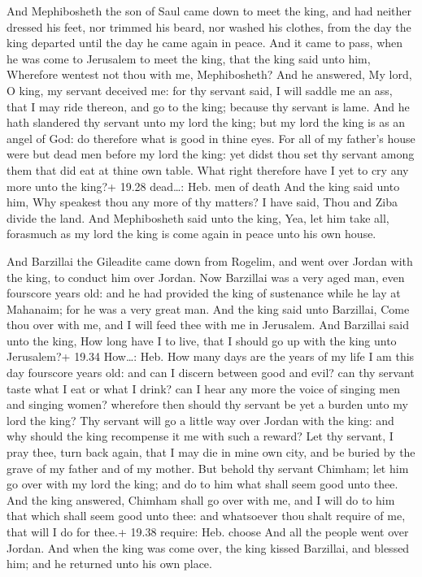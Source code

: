  And Mephibosheth the son of Saul came down to meet the
king, and had neither dressed his feet, nor trimmed his beard, nor
washed his clothes, from the day the king departed until the day he came
again in peace.  And it came to pass, when he was come to
Jerusalem to meet the king, that the king said unto him, Wherefore
wentest not thou with me, Mephibosheth?  And he answered,
My lord, O king, my servant deceived me: for thy servant said, I will
saddle me an ass, that I may ride thereon, and go to the king; because
thy servant is lame.  And he hath slandered thy servant
unto my lord the king; but my lord the king is as an angel of God: do
therefore what is good in thine eyes.  For all of my
father's house were but dead men before my lord the king: yet didst thou
set thy servant among them that did eat at thine own table. What right
therefore have I yet to cry any more unto the king?+ 19.28 dead\ldots:
Heb. men of death  And the king said unto him, Why speakest
thou any more of thy matters? I have said, Thou and Ziba divide the
land.  And Mephibosheth said unto the king, Yea, let him
take all, forasmuch as my lord the king is come again in peace unto his
own house.

 And Barzillai the Gileadite came down from Rogelim, and
went over Jordan with the king, to conduct him over Jordan.
 Now Barzillai was a very aged man, even fourscore years
old: and he had provided the king of sustenance while he lay at
Mahanaim; for he was a very great man.  And the king said
unto Barzillai, Come thou over with me, and I will feed thee with me in
Jerusalem.  And Barzillai said unto the king, How long have
I to live, that I should go up with the king unto Jerusalem?+ 19.34
How\ldots: Heb. How many days are the years of my life  I
am this day fourscore years old: and can I discern between good and
evil? can thy servant taste what I eat or what I drink? can I hear any
more the voice of singing men and singing women? wherefore then should
thy servant be yet a burden unto my lord the king?  Thy
servant will go a little way over Jordan with the king: and why should
the king recompense it me with such a reward?  Let thy
servant, I pray thee, turn back again, that I may die in mine own city,
and be buried by the grave of my father and of my mother. But behold thy
servant Chimham; let him go over with my lord the king; and do to him
what shall seem good unto thee.  And the king answered,
Chimham shall go over with me, and I will do to him that which shall
seem good unto thee: and whatsoever thou shalt require of me, that will
I do for thee.+ 19.38 require: Heb. choose  And all the
people went over Jordan. And when the king was come over, the king
kissed Barzillai, and blessed him; and he returned unto his own place.

